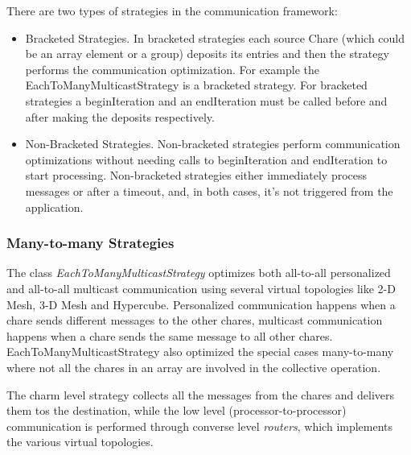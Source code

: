 {There are two types of strategies in the communication framework:

\begin{itemize}

\item Bracketed Strategies. In bracketed strategies each source Chare
(which could be an array element or a group) deposits its entries and then the
strategy performs the communication optimization. For example the
EachToManyMulticastStrategy is a bracketed strategy. For bracketed strategies a
beginIteration and an endIteration must be called before and after making the
deposits respectively.

\item Non-Bracketed Strategies. Non-bracketed strategies perform communication
optimizations without needing calls to beginIteration and endIteration to start
processing. Non-bracketed strategies either immediately process messages or
after a timeout, and, in both cases, it's not triggered from the application.

\end{itemize}

\subsubsection{Many-to-many Strategies}

The class {\em EachToManyMulticastStrategy} optimizes both all-to-all
personalized and all-to-all multicast communication using several virtual
topologies like 2-D Mesh, 3-D Mesh and Hypercube. Personalized communication
happens when a chare sends different messages to the other chares, multicast
communication happens when a chare sends the same message to all other chares.
EachToManyMulticastStrategy also optimized the special cases many-to-many where
not all the chares in an array are involved in the collective operation.

The charm level strategy collects all the messages from the chares and delivers
them tos the destination, while the low level (processor-to-processor) communication
is performed through converse level {\em routers}, which implements the various
virtual topologies.


}
